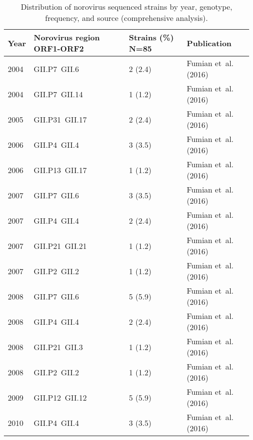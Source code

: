 \begin{table}[htbp]
	\centering
	\caption{Distribution of norovirus sequenced strains by year, genotype, frequency, and source (comprehensive analysis).}
	\scriptsize
	\begin{tabular}{p{0.6cm}p{3.2cm}p{1.8cm}p{2.5cm}}
		\toprule
		\textbf{Year} & \textbf{Norovirus region ORF1-ORF2} & \textbf{Strains (\%) N=85} & \textbf{Publication}   \\
		\midrule
		2004          & GII.P7~GII.6                        & 2 (2.4)                    & Fumian et~al. (2016)   \\
		2004          & GII.P7~GII.14                       & 1 (1.2)                    & Fumian et~al. (2016)   \\
		2005          & GII.P31~GII.17                      & 2 (2.4)                    & Fumian et~al. (2016)   \\
		2006          & GII.P4~GII.4                        & 3 (3.5)                    & Fumian et~al. (2016)   \\
		2006          & GII.P13~GII.17                      & 1 (1.2)                    & Fumian et~al. (2016)   \\
		2007          & GII.P7~GII.6                        & 3 (3.5)                    & Fumian et~al. (2016)   \\
		2007          & GII.P4~GII.4                        & 2 (2.4)                    & Fumian et~al. (2016)   \\
		2007          & GII.P21~GII.21                      & 1 (1.2)                    & Fumian et~al. (2016)   \\
		2007          & GII.P2~GII.2                        & 1 (1.2)                    & Fumian et~al. (2016)   \\
		2008          & GII.P7~GII.6                        & 5 (5.9)                    & Fumian et~al. (2016)   \\
		2008          & GII.P4~GII.4                        & 2 (2.4)                    & Fumian et~al. (2016)   \\
		2008          & GII.P21~GII.3                       & 1 (1.2)                    & Fumian et~al. (2016)   \\
		2008          & GII.P2~GII.2                        & 1 (1.2)                    & Fumian et~al. (2016)   \\
		2009          & GII.P12~GII.12                      & 5 (5.9)                    & Fumian et~al. (2016)   \\
		2010          & GII.P4~GII.4                        & 3 (3.5)                    & Fumian et~al. (2016)   \\

\end{tabular}
\end{table}
